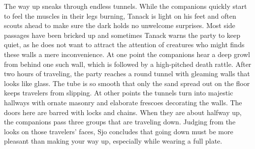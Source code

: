 The way up sneaks through endless tunnels. While the companions quickly start to feel the muscles in their legs burning, Tanack is light on his feet and often scouts ahead to make sure the dark holds no unwelcome surprises. Most side passages have been bricked up and sometimes Tanack warns the party to keep quiet, as he does not want to attract the attention of creatures who might finds these walls a mere inconvenience. At one point the companions hear a deep growl from behind one such wall, which is followed by a high-pitched death rattle. After two hours of traveling, the party reaches a round tunnel with gleaming walls that looks like glass. The tube is so smooth that only the sand spread out on the floor keeps travelers from slipping. At other points the tunnels turn into majestic hallways with ornate masonry and elaborate frescoes decorating the walls. The doors here are barred with locks and chains. When they are about halfway up, the companions pass three groups that are traveling down. Judging from the looks on those travelers' faces, Sjo concludes that going down must be more pleasant than making your way up, especially while wearing a full plate.\\

